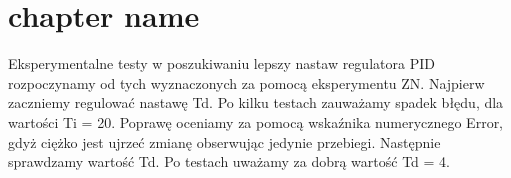 \chapter{chapter name}

Eksperymentalne testy w poszukiwaniu lepszy nastaw regulatora PID rozpoczynamy od tych wyznaczonych za pomocą eksperymentu ZN.
Najpierw zaczniemy regulować nastawę Td. Po kilku testach zauważamy spadek błędu, dla wartości Ti = 20. Poprawę oceniamy za pomocą wskaźnika numerycznego Error,
gdyż ciężko jest ujrzeć zmianę obserwując jedynie przebiegi. Następnie sprawdzamy wartość Td. Po testach uważamy za dobrą wartość Td = 4.
